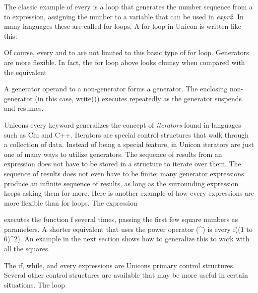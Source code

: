 The classic example of \textsf{every} is a loop that generates the
number sequence from a \textsf{to} expression, assigning the number to
a variable that can be used in \textsf{\textit{expr2}}. In many
languages these are called {\textquotedbl}for{\textquotedbl} loops. A
for loop in Unicon is written like this:


Of course, \textsf{every} and \textsf{to} are not limited to this basic
type of for loop. Generators are more flexible. In fact, the for loop
above looks clumsy when compared with the equivalent


A generator operand to a non-generator forms a generator. The enclosing
non-generator (in this case, \textsf{write()}) executes repeatedly as
the generator suspends and resumes.

Unicon{\textquotesingle}s \textsf{every} keyword generalizes the concept
of \textit{iterator}\textit{s} found in languages such
as Clu and C++. Iterators are special control structures that walk
through a collection of data. Instead of being a special feature, in
Unicon iterators are just one of many ways to utilize generators. The
sequence of results from an expression does
not have to be stored in a structure to iterate over them. The sequence
of results does not even have to be finite; many
generator expressions produce an infinite sequence of
results, as long as the surrounding expression keeps asking them for
more. Here is another example of how \textsf{every} expressions are
more flexible than for loops. The expression


\noindent
executes the function \textsf{f} several times, passing the first few
square numbers as parameters. A shorter equivalent that uses the power
operator (\textsf{\^{}}) is \textsf{every f((1 to 6)\^{}2)}. An example
in the next section shows how to generalize this to work with all the
squares.

The \textsf{if}, \textsf{while}, and \textsf{every} expressions are
Unicon{\textquotesingle}s primary control structures. Several other
control structures are available that may be more useful in certain
situations. The loop


